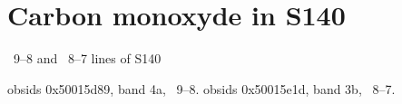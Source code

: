 \section{Carbon monoxyde in S140}
~9--8 and ~8--7 lines of S140

obsids 0x50015d89, band 4a, ~9--8.
obsids 0x50015e1d, band 3b, ~8--7.
